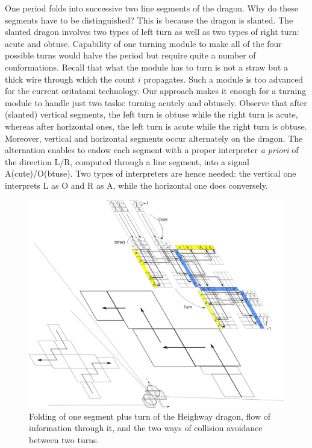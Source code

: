One period folds into successive two line segments of the dragon. 
Why do these segments have to be distinguished? 
This is because the dragon is slanted. 
The slanted dragon involves two types of left turn as well as two types of right turn: acute and obtuse. 
Capability of one turning module to make all of the four possible turns would halve the period but require quite a number of conformations. 
Recall that what the module has to turn is not a straw but a thick wire through which the count $i$ propagates. 
Such a module is too advanced for the current oritatami technology.  
Our approach makes it enough for a turning module to handle just two tasks: turning acutely and obtusely. 
Observe that after (slanted) vertical segments, the left turn is obtuse while the right turn is acute, whereas after horizontal ones, the left turn is acute while the right turn is obtuse. 
Moreover, vertical and horizontal segments occur alternately on the dragon. 
The alternation enables to endow each segment with a proper interpreter \textit{a priori} of the direction L/R, computed through a line segment, into a signal A(cute)/O(btuse).  
Two types of interpreters are hence needed: the vertical one interprets L as O and R as A, while the horizontal one does conversely. 

\begin{figure}[tb]
\includegraphics[width=0.9\linewidth]{pic/dragon_vol4.pdf}
\caption{
Folding of one segment plus turn of the Heighway dragon, flow of information through it, and the two ways of collision avoidance between two turns.
}
\label{fig:abst_dragon}
\end{figure}

